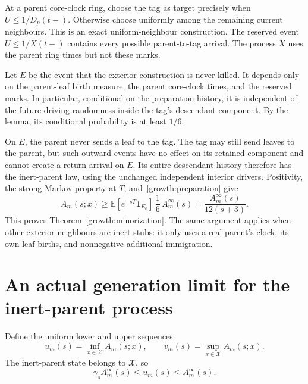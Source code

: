 At a parent core-clock ring, choose the tag as target precisely when
$U\le1/D_p(t-)$. Otherwise choose uniformly among the remaining current
neighbours. This is an exact uniform-neighbour construction. The
reserved event $U\le1/X(t-)$ contains every possible parent-to-tag
arrival. The process $X$ uses the parent ring times but not these marks.

Let $E$ be the event that the exterior construction is never killed.
It depends only on the parent-leaf birth measure, the parent core-clock
times, and the reserved marks. In particular, conditional on the
preparation history, it is independent of the future driving randomness
inside the tag's descendant component. By the lemma, its conditional
probability is at least $1/6$.

On $E$, the parent never sends a leaf to the tag. The tag may still
send leaves to the parent, but such outward events have no effect on
its retained component and cannot create a return arrival on $E$.
Its entire descendant history therefore has the inert-parent law,
using the unchanged independent interior drivers. Positivity, the
strong Markov property at $T$, and~\eqref{growth:preparation} give
\[
 A_m(s;x)
 \ge
 \mathbb E[e^{-sT}\mathbf1_{E_0}]\,
 \frac16\,A_m^\infty(s)
 =
 \frac{A_m^\infty(s)}{12(s+3)}.
\]
This proves Theorem~\ref{growth:minorization}. The same argument applies
when other exterior neighbours are inert stubs: it only uses a real
parent's clock, its own leaf births, and nonnegative additional
immigration.

\section{An actual generation limit for the inert-parent process}

Define the uniform lower and upper sequences
\[
 u_m(s)=\inf_{x\in\mathcal X}A_m(s;x),\qquad
 v_m(s)=\sup_{x\in\mathcal X}A_m(s;x).
\]
The inert-parent state belongs to $\mathcal X$, so
\begin{equation}\label{growth:inf-comparison}
 \gamma_s A_m^\infty(s)\le u_m(s)\le A_m^\infty(s).
\end{equation}

